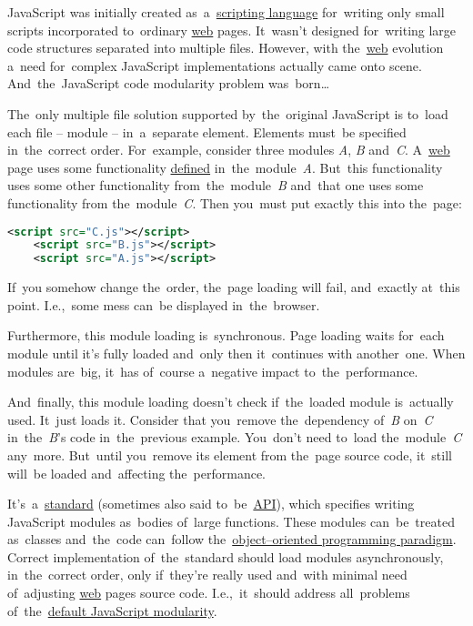 \label{javascriptmodularity}
JavaScript was initially created as~a~\hyperref[scriptinglanguages]{scripting language} for~writing only small scripts incorporated to~ordinary \hyperref[internetweb]{web} pages.
It~wasn't designed for~writing large code structures separated into multiple files.
However, with the~\hyperref[internetweb]{web} evolution a~need for~complex JavaScript implementations actually came onto scene.
And~the~JavaScript code modularity problem was~born\dots

The~only multiple file solution supported by~the~original JavaScript is to~load each file -- module --  in~a~separate  element.
Elements must~be specified in~the~correct order.
For~example, consider three modules \textit{A}, \textit{B} and~\textit{C}.
A~\hyperref[internetweb]{web} page uses some functionality \hyperref[declarationdefinition]{defined} in~the~module~\textit{A}.
But~this functionality uses some other functionality from~the~module~\textit{B} and~that one uses some functionality from the~module~\textit{C}.
Then you~must put exactly this into the~page:

\begin{lstlisting}[language=XML,frame=no]
    <script src="C.js"></script>
    <script src="B.js"></script>
    <script src="A.js"></script>
\end{lstlisting}

\noindent If~you somehow change the~order, the~page loading will fail, and~exactly at~this point.
I.e.,~some mess can~be displayed in~the~browser.

Furthermore, this module loading is~synchronous.
Page loading waits for~each module until it's fully loaded and~only then it~continues with another~one.
When modules are~big, it~has of~course a~negative impact to~the~performance.

And~finally, this module loading doesn't check if~the~loaded module is~actually used.
It~just loads it.
Consider that you~remove the~dependency of~\textit{B} on~\textit{C} in~the~\textit{B}'s code in~the~previous example.
You~don't need to~load the~module~\textit{C} any~more.
But~until you~remove its  element from the~page source code, it~still will~be loaded and~affecting the~performance.

\label{amd}
It's~a~\hyperref[protocolstandard]{standard} (sometimes also said to~be~\hyperref[api]{API}), which specifies writing JavaScript modules as~bodies of~large functions.
These modules can~be~treated as~classes and~the~code can~follow the~\hyperref[objectorientedprogramming]{object--oriented programming paradigm}.
Correct implementation of~the~standard should load modules asynchronously, in~the~correct order, only if~they're really used and~with minimal need of~adjusting \hyperref[internetweb]{web} pages source code.
I.e.,~it~should address all~problems of~the~\hyperref[javascriptmodularity]{default JavaScript modularity}.

